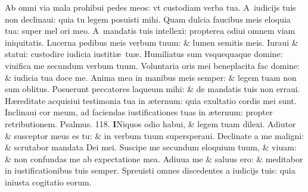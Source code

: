 \documentclass[a5paper,10pt]{book}
\def\ae{æ}
\begin{document}
\begin{multicols*}{2}
\newline \color{red} A\color{black}b omni via mala prohibui pedes meos: vt custodiam verba tua.
\newline \color{red} A\color{black}\ iudicijs tuis non declinaui: quia tu legem posuisti mihi.
\newline \color{red} Q\color{black}uam dulcia faucibus meis eloquia tua: super mel ori meo.
\newline \color{red} A\color{black}\ mandatis tuis intellexi: propterea odiui omnem viam iniquitatis.
\newline \color{red} L\color{black}ucerna pedibus meis verbum tuum: \& lumen semitis meis.
\newline \color{red} I\color{black}uraui \& statui: custodire iudicia iustiti\ae \ tu\ae .
\newline \color{red} H\color{black}umiliatus sum vsquequaque domine: viuifica me secundum verbum tuum.
\newline \color{red} V\color{black}oluntaria oris mei beneplacita fac domine: \& iudicia tua doce me.
\newline \color{red} A\color{black}nima mea in manibus meis semper: \& legem tuam non sum oblitus.
\newline \color{red} P\color{black}osuerunt peccatores laqueum mihi: \& de mandatis tuis non erraui.
\newline \color{red} H\color{black}\ae reditate acquisiui testimonia tua in \ae ternum: quia exultatio cordis mei sunt.
\newline \color{red} I\color{black}nclinaui cor meum, ad faciendas iustificationes tuas in \ae ternum: propter retributionem. \quad \color{red} Psalmus. \hypertarget{ps118.8}{118.} \color{black}
\vspace{-.5em}
\lettrine[lines=2]{\bfseries \color{red} I}{}Niquos odio habui, \& legem tuam dilexi.
\newline \color{red} A\color{black}diutor \& susceptor meus es tu: \& in verbum tuum supersperaui.
\newline \color{red} D\color{black}eclinate a me maligni: \& scrutabor mandata Dei mei.
\newline \color{red} S\color{black}uscipe me secundum eloquium  tuum, \& viuam: \& non confundas me ab expectatione mea.
\newline \color{red} A\color{black}diuua me \& saluus ero: \& meditabor in iustificationibus tuis semper.
\newline \color{red} S\color{black}preuisti omnes discedentes a iudicijs tuis: quia iniusta cogitatio eorum.

\end{multicols*}
\end{document}
